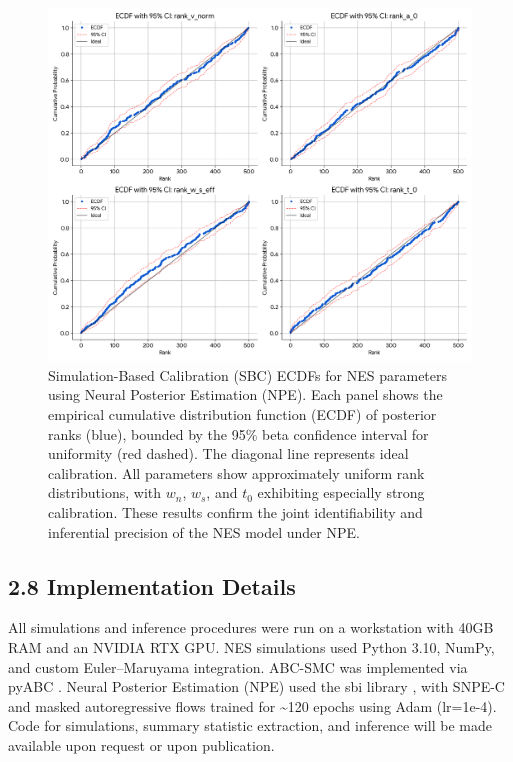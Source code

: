 \documentclass[
  11pt,
]{article}
\begin{document}
\begin{figure}
\centering
\includegraphics[width=1\linewidth,height=\textheight,keepaspectratio]{figures/NPE_SBC_ECDF_6_Param.png}
\caption{Simulation-Based Calibration (SBC) ECDFs for NES parameters
using Neural Posterior Estimation (NPE). Each panel shows the empirical
cumulative distribution function (ECDF) of posterior ranks (blue),
bounded by the 95\% beta confidence interval for uniformity (red
dashed). The diagonal line represents ideal calibration. All parameters
show approximately uniform rank distributions, with \(w_n\), \(w_s\),
and \(t_0\) exhibiting especially strong calibration. These results
confirm the joint identifiability and inferential precision of the NES
model under NPE.}\label{fig:npe_sbc}
\end{figure}

\subsection{2.8 Implementation Details}\label{implementation-details}

All simulations and inference procedures were run on a workstation with
40GB RAM and an NVIDIA RTX GPU. NES simulations used Python 3.10, NumPy,
and custom Euler--Maruyama integration. ABC-SMC was implemented via
pyABC \autocite{Klinger2018pyABC}. Neural Posterior Estimation (NPE)
used the sbi library \autocite{sbi_package_tejero_etal_2020}, with
SNPE-C and masked autoregressive flows trained for \textasciitilde120
epochs using Adam (lr=1e-4). Code for simulations, summary statistic
extraction, and inference will be made available upon request or upon
publication.
\end{document}
